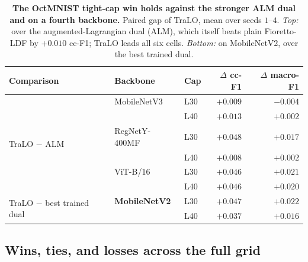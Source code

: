 \documentclass[10pt]{article}
\begin{document}
\begin{table}[t]\centering\small\color{blue}
\setlength{\tabcolsep}{5pt}
\caption{\color{blue}\textbf{The OctMNIST tight-cap win holds against the
stronger ALM dual and on a fourth backbone.} Paired gap of TraLO, mean over seeds
$1$--$4$. \emph{Top:} over the augmented-Lagrangian dual (ALM), which itself beats
plain Fioretto-LDF by $+0.010$ cc-F1; TraLO leads all six cells. \emph{Bottom:} on
MobileNetV2, over the best trained dual.}
\label{tab:almbb}
\begin{tabular}{lll rr}
\toprule
Comparison & Backbone & Cap & $\Delta$ cc-F1 & $\Delta$ macro-F1 \\
\midrule
\multirow{6}{*}{TraLO $-$ ALM}
 & MobileNetV3   & L30 & $+0.009$ & $-0.004$ \\
 &               & L40 & $+0.013$ & $+0.002$ \\
 & RegNetY-400MF & L30 & $+0.048$ & $+0.017$ \\
 &               & L40 & $+0.008$ & $+0.002$ \\
 & ViT-B/16      & L30 & $+0.046$ & $+0.021$ \\
 &               & L40 & $+0.046$ & $+0.020$ \\
\midrule
\multirow{2}{2.2cm}{TraLO $-$ best trained dual}
 & \textbf{MobileNetV2} & L30 & $+0.047$ & $+0.022$ \\
 &                      & L40 & $+0.037$ & $+0.016$ \\
\bottomrule
\end{tabular}
\end{table}

\subsection{Wins, ties, and losses across the full grid}
\label{sec:regime}
\end{document}
